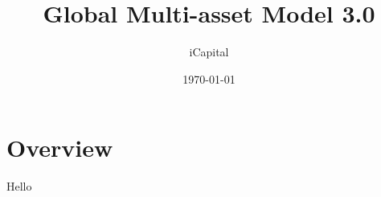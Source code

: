 \documentclass[12pt]{article}
\begin{document}
\newcommand{\tstar}{\ensuremath{^\text{***}}}
\newcommand{\dstar}{\ensuremath{^\text{**}}}
\newcommand{\ostar}{\ensuremath{^\text{*}}}


\begin{titlepage}
\title{Global Multi-asset Model 3.0}
\author{iCapital}

\date{\today}
\maketitle


\setcounter{page}{0}
\thispagestyle{empty}
\end{titlepage}
\pagebreak \newpage

\maketitle



\clearpage
\setcounter{page}{1}

\section{Overview} \label{sec:overview}
Hello
\end{document}
